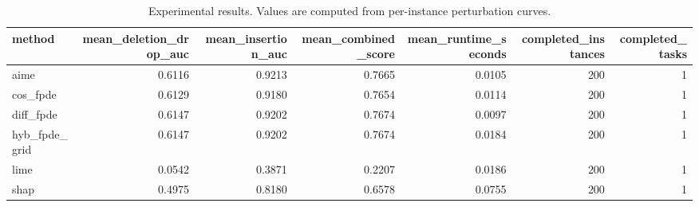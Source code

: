 \begin{table}[t]
\caption{Experimental results. Values are computed from per-instance perturbation curves.}
\label{tab:main_results_computed}
\centering
\begin{tabular}{lrrrrrr}
\toprule
method & mean\_deletion\_drop\_auc & mean\_insertion\_auc & mean\_combined\_score & mean\_runtime\_seconds & completed\_instances & completed\_tasks \\
\midrule
aime & 0.6116 & 0.9213 & 0.7665 & 0.0105 & 200 & 1 \\
cos\_fpde & 0.6129 & 0.9180 & 0.7654 & 0.0114 & 200 & 1 \\
diff\_fpde & 0.6147 & 0.9202 & 0.7674 & 0.0097 & 200 & 1 \\
hyb\_fpde\_grid & 0.6147 & 0.9202 & 0.7674 & 0.0184 & 200 & 1 \\
lime & 0.0542 & 0.3871 & 0.2207 & 0.0186 & 200 & 1 \\
shap & 0.4975 & 0.8180 & 0.6578 & 0.0755 & 200 & 1 \\
\bottomrule
\end{tabular}

\end{table}
